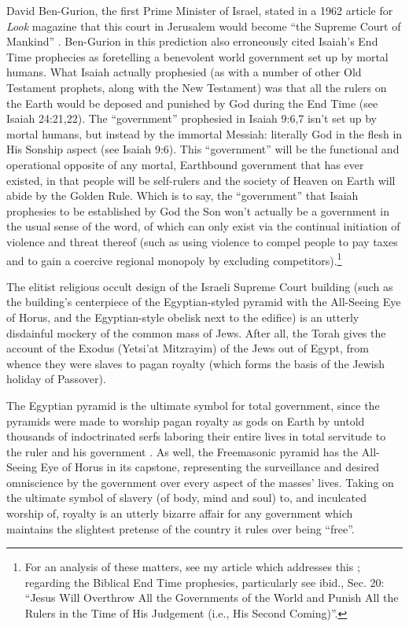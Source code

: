 \documentclass[letterpaper,12pt]{article}
\begin{document}
David Ben-Gurion, the first Prime Minister of Israel, stated in a 1962 article for \emph{Look} magazine that this court in Jerusalem would become ``the Supreme Court of Mankind'' \cite{BenGurion1962}. Ben-Gurion in this prediction also erroneously cited Isaiah's End Time prophecies as foretelling a benevolent world government set up by mortal humans. What Isaiah actually prophesied (as with a number of other Old Testament prophets, along with the New Testament) was that all the rulers on the Earth would be deposed and punished by God during the End Time (see Isaiah 24:21,22). The ``government'' prophesied in Isaiah 9:6,7 isn't set up by mortal humans, but instead by the immortal Messiah: literally God in the flesh in His Sonship aspect (see Isaiah 9:6). This ``government'' will be the functional and operational opposite of any mortal, Earthbound government that has ever existed, in that people will be self-rulers and the society of Heaven on Earth will abide by the Golden Rule. Which is to say, the ``government'' that Isaiah prophesies to be established by God the Son won't actually be a government in the usual sense of the word, of which can only exist via the continual initiation of violence and threat thereof (such as using violence to compel people to pay taxes and to gain a coercive regional monopoly by excluding competitors).\footnote{For an analysis of these matters, see my article which addresses this \cite{Redford2001}; regarding the Biblical End Time prophesies, particularly see ibid., Sec. 20: ``Jesus Will Overthrow All the Governments of the World and Punish All the Rulers in the Time of His Judgement (i.e., His Second Coming)''.}

The elitist religious occult design of the Israeli Supreme Court building (such as the building's centerpiece of the Egyptian-styled pyramid with the All-Seeing Eye of Horus, and the Egyptian-style obelisk next to the edifice) is an utterly disdainful mockery of the common mass of Jews. After all, the Torah gives the account of the Exodus (Yetsi'at Mitzrayim) of the Jews out of Egypt, from whence they were slaves to pagan royalty (which forms the basis of the Jewish holiday of Passover).

The Egyptian pyramid is the ultimate symbol for total government, since the pyramids were made to worship pagan royalty as gods on Earth by untold thousands of indoctrinated serfs laboring their entire lives in total servitude to the ruler and his government \cite{Wilkinson2011}. As well, the Freemasonic pyramid has the All-Seeing Eye of Horus in its capstone, representing the surveillance and desired omniscience by the government over every aspect of the masses' lives. Taking on the ultimate symbol of slavery (of body, mind and soul) to, and inculcated worship of, royalty is an utterly bizarre affair for any government which maintains the slightest pretense of the country it rules over being ``free''.
\end{document}
